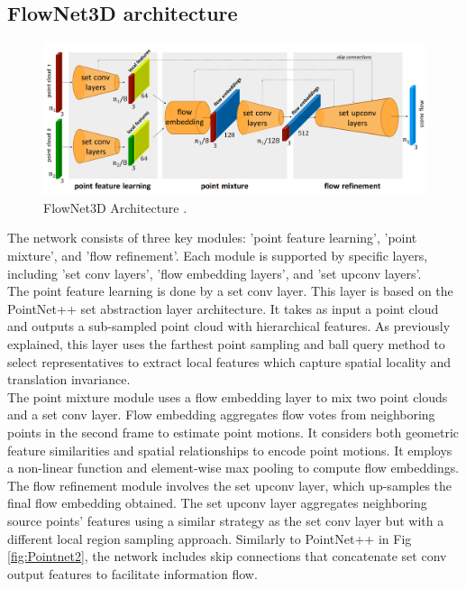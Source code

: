\subsection{FlowNet3D architecture}
\begin{figure}[H]
    \centering
    \includegraphics[width=\textwidth]{Img/05_FlowNet3D.png}
    \caption{FlowNet3D Architecture \cite{FlowNet}.}
    \label{fig:FlowNet}
\end{figure}
The network consists of three key modules: 'point feature learning', 'point mixture', and 'flow refinement'. Each module is supported by specific layers, including 'set conv layers', 'flow embedding layers', and 'set upconv layers'.\\

The point feature learning is done by a set conv layer. This layer is based on the PointNet++ set abstraction layer architecture. It takes as input a point cloud and outputs a sub-sampled point cloud with hierarchical features. As previously explained, this layer uses the farthest point sampling and ball query method to select representatives to extract local features which capture spatial locality and translation invariance.\\

The point mixture module uses a flow embedding layer to mix two point clouds and a set conv layer. Flow embedding aggregates flow votes from neighboring points in the second frame to estimate point motions. It considers both geometric feature similarities and spatial relationships to encode point motions. It employs a non-linear function and element-wise max pooling to compute flow embeddings.\\

The flow refinement module involves the set upconv layer, which up-samples the final flow embedding obtained. The set upconv layer aggregates neighboring source points' features using a similar strategy as the set conv layer but with a different local region sampling approach. Similarly to PointNet++ in Fig \ref{fig:Pointnet2}, the network includes skip connections that concatenate set conv output features to facilitate information flow.

